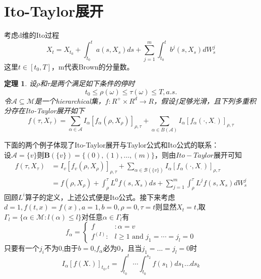 \documentclass{article}%
\newtheorem{thm}{\bf 定理}[section]
\begin{document}
\section{Ito-Taylor展开}
考虑d维的Ito过程
\begin{equation}
X_{t}=X_{t_{0}}+\int_{t_{0}}^{t} a\left(s, X_{s}\right) d s+\sum_{j=1}^{m} \int_{t_{0}}^{t} b^{j}\left(s, X_{s}\right) d W_{s}^{j}
\end{equation}
这里$t\in [t_0,T]$，m代表Brown的分量数。
\begin{thm}
设$\rho$和$\tau$是两个满足如下条件的停时
$$t_0 \leq \rho(\omega) \leq \tau(\omega) \leq T,a.s.$$
令$\mathcal{A}\subseteq\mathcal{M}$是一个hierarchical集，$f: R^{+} \times R^{d} \rightarrow R$，假设$f$足够光滑，且下列多重积分存在Ito-Taylor展开如下
\begin{equation}
f\left(\tau, X_{\tau}\right)=\sum_{\alpha \in \mathcal{A}} I_{\alpha}\left[f_{\alpha}\left(\rho, X_{\rho}\right)\right]_{\rho, \tau}+\sum_{\alpha \in B(\mathcal{A})} I_{\alpha}\left[f_{\alpha}\left(\cdot, X_{\cdot}\right)\right]_{\rho, \tau}
\end{equation}
\end{thm}
下面的两个例子体现了Ito-Taylor展开与Taylor公式和Ito公式的联系：\\
设$\mathcal{A}=\{v\}$则$\boldsymbol{B}(\{v\})=\{(0),(1), \ldots,(m)\}$，则由$Ito-Taylor$展开可知
\begin{equation}
\begin{aligned}
f\left(\tau, X_{\tau}\right) &=I_{v}\left[f_{v}\left(\rho, X_{\rho}\right)\right]_{\rho, \tau}+\sum_{\alpha \in \mathcal{B}(\{v\})} I_{\alpha}\left[f_{\alpha}\left(\cdot, X_{\cdot}\right)\right]_{\rho, \tau} \\
&=f\left(\rho, X_{\rho}\right)+\int_{\rho}^{\tau} L^{0} f\left(s, X_{s}\right) d s+\sum_{j=1}^{m} \int_{\rho}^{\tau} L^{j} f\left(s, X_{s}\right) d W_{s}^{j}
\end{aligned}
\end{equation}
回顾$L^i$算子的定义，上述公式便是Ito公式。接下来考虑$d=1,f(t,x)=f(x),a=1,b=0,\rho=0,\tau=t$则显然$X_t=t$,取$\Gamma_{l}=\{\alpha \in \mathcal{M}: l(\alpha) \leq l\}$对任意$\alpha \in \Gamma_{l}$有
$$
f_{\alpha}=\left\{\begin{array}{ll}
f & : \alpha=v \\
f^{(I)}: & l \geq 1 \text { and } j_{1}=\cdots=j_{l}=0
\end{array}\right.
$$
只要有一个$j_i$不为0,由于$b=0$,$f_{\alpha}$必为0，且当$j_1=...=j_l=0$时
$$
I_{\alpha}[f(X .)]_{t_{0}, t}=\int_{t_{0}}^{t} \cdots \int_{t_{0}}^{s_{2}} f\left(s_{1}\right) d s_{1} \ldots d s_{k}
$$
\end{document}
